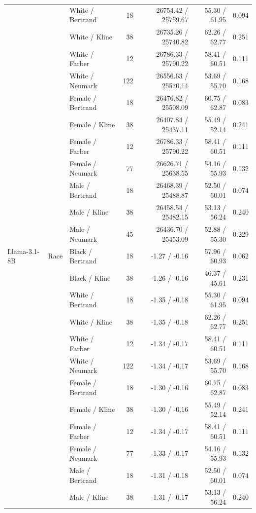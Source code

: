 \begin{longtable}{@{}lllrrrr@{}}
 &  & White / Bertrand & 18 & 26754.42 / 25759.67 & 55.30 / 61.95 & 0.094 \\
 &  & White / Kline & 38 & 26735.26 / 25740.82 & 62.26 / 62.77 & 0.251 \\
 &  & White / Farber & 12 & 26786.33 / 25790.22 & 58.41 / 60.51 & 0.111 \\
 &  & White / Neumark & 122 & 26556.63 / 25570.14 & 53.69 / 55.70 & 0.168 \\
 &  & Female / Bertrand & 18 & 26476.82 / 25508.09 & 60.75 / 62.87 & 0.083 \\
 &  & Female / Kline & 38 & 26407.84 / 25437.11 & 55.49 / 52.14 & 0.241 \\
 &  & Female / Farber & 12 & 26786.33 / 25790.22 & 58.41 / 60.51 & 0.111 \\
 &  & Female / Neumark & 77 & 26626.71 / 25638.55 & 54.16 / 55.93 & 0.132 \\
 &  & Male / Bertrand & 18 & 26468.39 / 25488.87 & 52.50 / 60.01 & 0.074 \\
 &  & Male / Kline & 38 & 26458.54 / 25482.15 & 53.13 / 56.24 & 0.240 \\
 &  & Male / Neumark & 45 & 26436.70 / 25453.09 & 52.88 / 55.30 & 0.229 \\
\addlinespace
Llama-3.1-8B & Race & Black / Bertrand & 18 & -1.27 / -0.16 & 57.96 / 60.93 & 0.062 \\
 &  & Black / Kline & 38 & -1.26 / -0.16 & 46.37 / 45.61 & 0.231 \\
 &  & White / Bertrand & 18 & -1.35 / -0.18 & 55.30 / 61.95 & 0.094 \\
 &  & White / Kline & 38 & -1.35 / -0.18 & 62.26 / 62.77 & 0.251 \\
 &  & White / Farber & 12 & -1.34 / -0.17 & 58.41 / 60.51 & 0.111 \\
 &  & White / Neumark & 122 & -1.34 / -0.17 & 53.69 / 55.70 & 0.168 \\
 &  & Female / Bertrand & 18 & -1.30 / -0.16 & 60.75 / 62.87 & 0.083 \\
 &  & Female / Kline & 38 & -1.30 / -0.16 & 55.49 / 52.14 & 0.241 \\
 &  & Female / Farber & 12 & -1.34 / -0.17 & 58.41 / 60.51 & 0.111 \\
 &  & Female / Neumark & 77 & -1.33 / -0.17 & 54.16 / 55.93 & 0.132 \\
 &  & Male / Bertrand & 18 & -1.31 / -0.18 & 52.50 / 60.01 & 0.074 \\
 &  & Male / Kline & 38 & -1.31 / -0.17 & 53.13 / 56.24 & 0.240 \\

\end{longtable}
